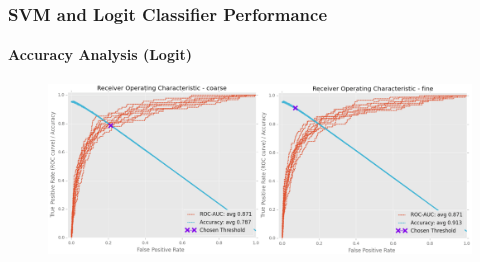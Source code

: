 \documentclass{beamer}
\begin{document}
\begin{frame}
    \frametitle{SVM and Logit Classifier Performance}  %
    \framesubtitle{Accuracy Analysis (Logit)}
    \begin{figure}[!htb]
        \centering
            \includegraphics[width=1.0\columnwidth]{fig/ROC}
        \label{fig:ROC}
    \end{figure}
\end{frame}
\end{document}
